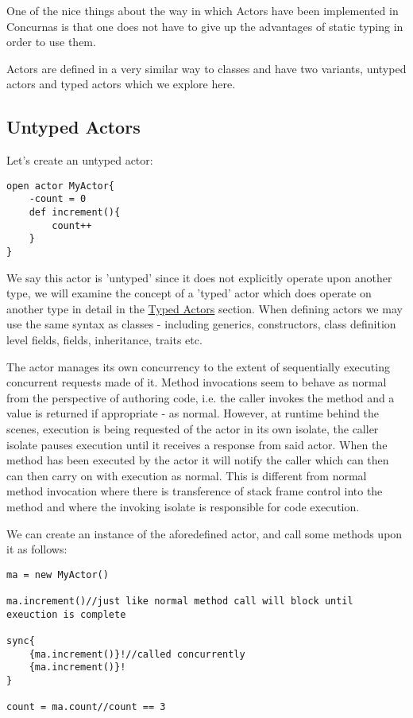 \documentclass[conc-doc]{subfiles}
\begin{document}
One of the nice things about the way in which Actors have been implemented in Concurnas is that one does not have to give up the advantages of static typing in order to use them.

Actors are defined in a very similar way to classes and have two variants, untyped actors and typed actors which we explore here.

\subsection{Untyped Actors}
Let's create an untyped actor:

\begin{lstlisting}
open actor MyActor{
	-count = 0
	def increment(){
		count++
	}
}
\end{lstlisting}

We say this actor is 'untyped' since it does not explicitly operate upon another type, we will examine the concept of a 'typed' actor which does operate on another type in detail in the \hyperref[subsec:typedactors]{Typed Actors} section. When defining actors we may use the same syntax as classes - including generics, constructors, class definition level fields, fields, inheritance, traits etc.

The actor manages its own concurrency to the extent of sequentially executing concurrent requests made of it. Method invocations seem to behave as normal from the perspective of authoring code, i.e. the caller invokes the method and a value is returned if appropriate - as normal. However, at runtime behind the scenes, execution is being requested of the actor in its own isolate, the caller isolate pauses execution until it receives a response from said actor. When the method has been executed by the actor it will notify the caller which can then can then carry on with execution as normal. This is different from normal method invocation where there is transference of stack frame control into the method and where the invoking isolate is responsible for code execution.

We can create an instance of the aforedefined actor, and call some methods upon it as follows:

\begin{lstlisting}
ma = new MyActor()

ma.increment()//just like normal method call will block until exeuction is complete

sync{
	{ma.increment()}!//called concurrently
	{ma.increment()}!
}

count = ma.count//count == 3
\end{lstlisting}
\end{document}

